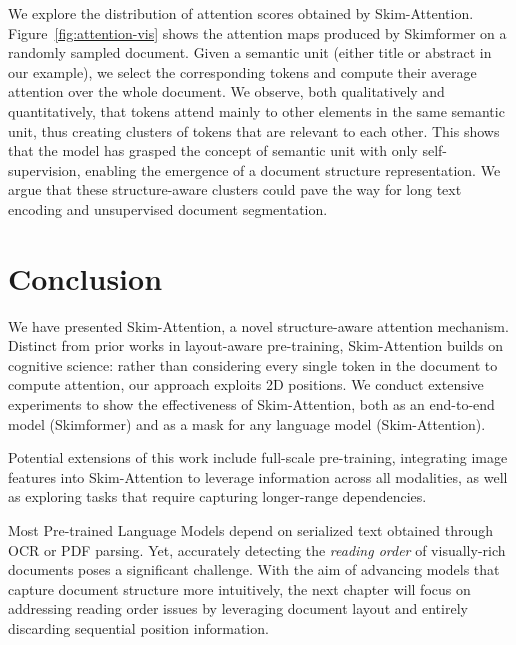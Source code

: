 We explore the distribution of attention scores obtained by Skim-Attention. Figure~\ref{fig:attention-vis} shows the attention maps produced by Skimformer on a randomly sampled document. Given a semantic unit (either title or abstract in our example), we select the corresponding tokens and compute their average attention over the whole document. We observe, both qualitatively and quantitatively, that tokens attend mainly to other elements in the same semantic unit, thus creating clusters of tokens that are relevant to each other. This shows that the model has grasped the concept of semantic unit with only self-supervision, enabling the emergence of a document structure representation. We argue that these structure-aware clusters could pave the way for long text encoding and unsupervised document segmentation.

\section{Conclusion}

We have presented Skim-Attention, a novel structure-aware attention mechanism. Distinct from prior works in layout-aware pre-training, Skim-Attention builds on cognitive science: rather than considering every single token in the document to compute attention, our approach exploits 2D positions. We conduct extensive experiments to show the effectiveness of Skim-Attention, both as an end-to-end model (Skimformer) and as a mask for any language model (Skim-Attention). 

Potential extensions of this work include full-scale pre-training, integrating image features into Skim-Attention to leverage information across all modalities, as well as exploring tasks that require capturing longer-range dependencies.

Most Pre-trained Language Models depend on serialized text obtained through \ac{OCR} or PDF parsing. Yet, accurately detecting the \textit{reading order} of visually-rich documents poses a significant challenge. With the aim of advancing models that capture document structure more intuitively, the next chapter will focus on addressing reading order issues by leveraging document layout and entirely discarding sequential position information.


